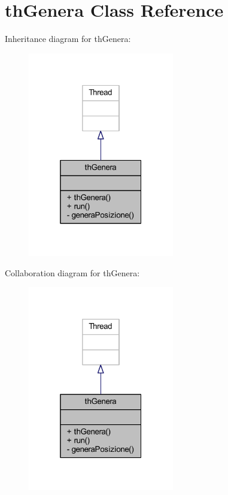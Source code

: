 \hypertarget{class_snake_1_1game_1_1threads_1_1th_genera}{}\section{th\+Genera Class Reference}
\label{class_snake_1_1game_1_1threads_1_1th_genera}


Inheritance diagram for th\+Genera\+:
\nopagebreak
\begin{figure}[H]
\begin{center}
\leavevmode
\includegraphics[width=181pt]{class_snake_1_1game_1_1threads_1_1th_genera__inherit__graph}
\end{center}
\end{figure}


Collaboration diagram for th\+Genera\+:
\nopagebreak
\begin{figure}[H]
\begin{center}
\leavevmode
\includegraphics[width=181pt]{class_snake_1_1game_1_1threads_1_1th_genera__coll__graph}
\end{center}
\end{figure}
